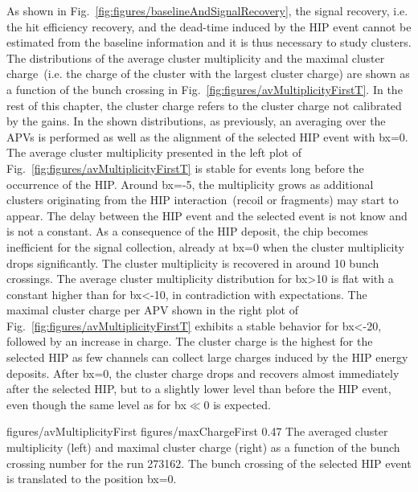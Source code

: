 As shown in Fig.~\ref{fig:figures/baselineAndSignalRecovery}, the signal recovery, i.e. the hit efficiency recovery, and the dead-time induced by the HIP event cannot be estimated from the baseline information and it is thus necessary to study clusters. The distributions of the average cluster multiplicity and the maximal cluster charge~(i.e. the charge of the cluster with the largest cluster charge)  are shown as a function of the bunch crossing in Fig.~\ref{fig:figures/avMultiplicityFirstT}. In the rest of this chapter, the cluster charge refers to the cluster charge not calibrated by the gains. In the shown distributions, as previously, an averaging over the APVs is performed as well as the alignment of the selected HIP event with bx=0. The average cluster multiplicity presented in the left plot of Fig.~\ref{fig:figures/avMultiplicityFirstT} is stable for events long before the occurrence of the HIP. Around bx=-5, the multiplicity grows as additional clusters originating from the HIP interaction~(recoil or fragments) may start to appear. The delay between the HIP event and the selected event is not know and is not a constant. As a consequence of the HIP deposit, the chip becomes inefficient for the signal collection, already at bx=0 when  the cluster multiplicity drops significantly. The cluster multiplicity is recovered in around 10 bunch crossings. The average cluster multiplicity distribution for bx>10 is flat with a constant higher than for bx<-10, in contradiction with expectations. The maximal cluster charge per APV shown in the right plot of Fig.~\ref{fig:figures/avMultiplicityFirstT} exhibits a stable behavior for bx<-20, followed by an increase in charge. The cluster charge is the highest for the selected HIP as few channels can collect large charges induced by the HIP energy deposits. After bx=0, the cluster charge drops and recovers almost immediately after the selected HIP, but to a slightly lower level than before the HIP event, even though the same level as for bx$\ll$0 is expected. 

                 {figures/avMultiplicityFirst} %
                 {figures/maxChargeFirst} %
                 {0.47}       %
                 { The averaged cluster multiplicity (left) and maximal cluster charge (right) as a function of the bunch crossing number for the run 273162. The bunch crossing of the selected HIP event is translated to the position bx=0. } %

